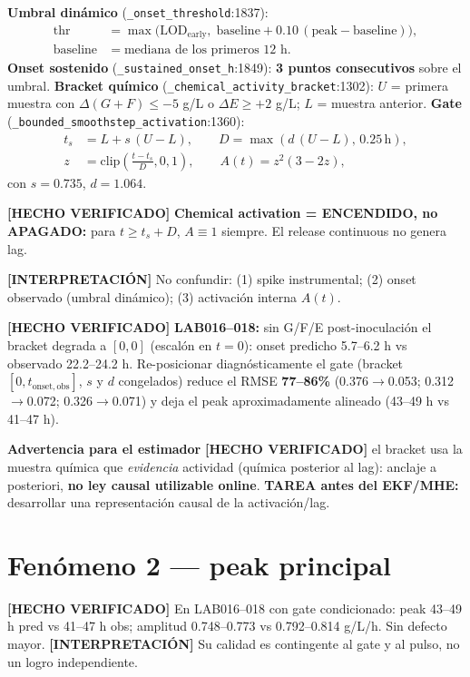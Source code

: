 \documentclass[11pt,a4paper]{article}
\newcommand{\hecho}{\textcolor{hecho}{\textbf{[HECHO VERIFICADO]}}}
\newcommand{\interp}{\textcolor{interp}{\textbf{[INTERPRETACI\'ON]}}}
\newcommand{\ruta}[1]{\texttt{\small #1}}
\begin{document}
\textbf{Umbral din\'amico} (\ruta{\_onset\_threshold}:1837):
\begin{align}
\text{thr} &= \max\!\big(\mathrm{LOD}_{\mathrm{early}},\; \mathrm{baseline} + 0.10\,(\text{peak}-\mathrm{baseline})\big),\\
\mathrm{baseline} &= \text{mediana de los primeros 12 h}.
\end{align}
\textbf{Onset sostenido} (\ruta{\_sustained\_onset\_h}:1849): \textbf{3 puntos consecutivos} sobre el umbral. \textbf{Bracket qu\'imico} (\ruta{\_chemical\_activity\_bracket}:1302): $U$ = primera muestra con $\Delta(G{+}F)\le -5$ g/L o $\Delta E \ge +2$ g/L; $L$ = muestra anterior. \textbf{Gate} (\ruta{\_bounded\_smoothstep\_activation}:1360):
\begin{align}
t_s &= L + s\,(U-L),\qquad D = \max(d\,(U-L),\,0.25\,\mathrm{h}),\\
z &= \mathrm{clip}\!\left(\tfrac{t-t_s}{D},0,1\right),\qquad A(t)=z^2(3-2z),
\end{align}
con $s = 0.735$, $d = 1.064$.

\hecho{} \textbf{Chemical activation = ENCENDIDO, no APAGADO:} para $t \ge t_s + D$, $A \equiv 1$ siempre. El release continuous no genera lag.

\interp{} No confundir: (1) spike instrumental; (2) onset observado (umbral din\'amico); (3) activaci\'on interna $A(t)$.

\hecho{} \textbf{LAB016--018:} sin G/F/E post-inoculaci\'on el bracket degrada a $[0,0]$ (escal\'on en $t=0$): onset predicho 5.7--6.2 h vs observado 22.2--24.2 h. Re-posicionar diagn\'osticamente el gate (bracket $[0, t_{\mathrm{onset,obs}}]$, $s$ y $d$ congelados) reduce el RMSE \textbf{77--86\%} (0.376$\to$0.053; 0.312$\to$0.072; 0.326$\to$0.071) y deja el peak aproximadamente alineado (43--49 h vs 41--47 h).

\textbf{Advertencia para el estimador} \hecho{} el bracket usa la muestra qu\'imica que \emph{evidencia} actividad (qu\'imica posterior al lag): anclaje a posteriori, \textbf{no ley causal utilizable online}. \textbf{TAREA antes del EKF/MHE:} desarrollar una representaci\'on causal de la activaci\'on/lag.

\section{Fen\'omeno 2 --- peak principal}

\hecho{} En LAB016--018 con gate condicionado: peak 43--49 h pred vs 41--47 h obs; amplitud 0.748--0.773 vs 0.792--0.814 g/L/h. Sin defecto mayor. \interp{} Su calidad es contingente al gate y al pulso, no un logro independiente.
\end{document}
